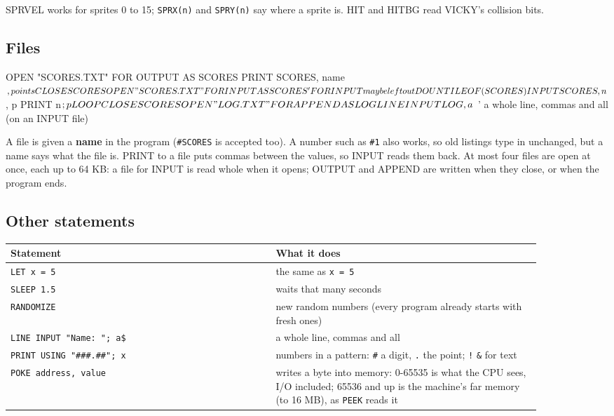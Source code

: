 SPRVEL works for sprites 0 to 15; \verb|SPRX(n)| and \verb|SPRY(n)| say where a
sprite is. HIT and HITBG read VICKY's collision bits.

\subsection{Files}

\begin{type}
OPEN "SCORES.TXT" FOR OUTPUT AS SCORES
PRINT SCORES, name$, points
CLOSE SCORES
OPEN "SCORES.TXT" FOR INPUT AS SCORES      ' FOR INPUT may be left out
DO UNTIL EOF(SCORES)
  INPUT SCORES, n$, p
  PRINT n$; p
LOOP
CLOSE SCORES
OPEN "LOG.TXT" FOR APPEND AS LOG
LINE INPUT LOG, a$                          ' a whole line, commas and all (on an INPUT file)
\end{type}

A file is given a \textbf{name} in the program (\verb|#SCORES| is accepted
too). A number such as \verb|#1| also works, so old listings type in
unchanged, but a name says what the file is. PRINT to a file puts commas between the values, so INPUT
reads them back. At most four files are open at once, each up to 64 KB:
a file for INPUT is read whole when it opens; OUTPUT and APPEND are
written when they close, or when the program ends.

\subsection{Other statements}

\begin{center}
\small
\begin{tabular}{@{}>{\raggedright\arraybackslash}p{0.44\linewidth} >{\raggedright\arraybackslash}p{0.44\linewidth}@{}}
\toprule
\textbf{Statement} & \textbf{What it does} \\
\midrule
\texttt{LET x = 5} & the same as \texttt{x = 5} \\
\texttt{SLEEP 1.5} & waits that many seconds \\
\verb|RANDOMIZE| & new random numbers (every program already starts with fresh ones) \\
\texttt{LINE INPUT "Name: "; a\$} & a whole line, commas and all \\
\texttt{PRINT USING "\#\#\#.\#\#"; x} & numbers in a pattern: \verb|#| a digit, \verb|.| the point; \verb|!| \verb|&| for text \\
\texttt{POKE address, value} & writes a byte into memory: 0-65535 is what the CPU sees, I/O included; 65536 and up is the machine's far memory (to 16 MB), as \verb|PEEK| reads it \\
\bottomrule
\end{tabular}
\end{center}

